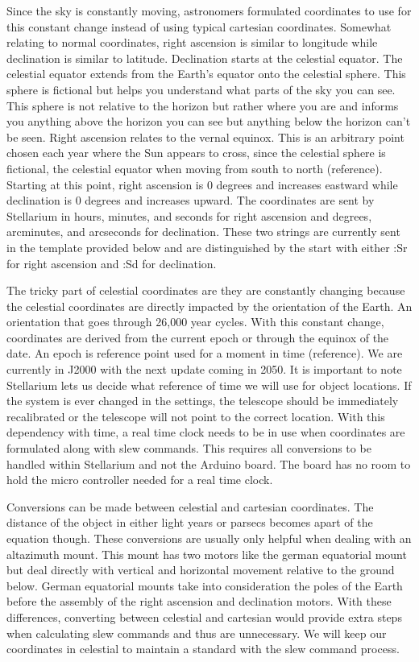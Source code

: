 \documentclass[12pt]{report}
\begin{document}
Since the sky is constantly moving, astronomers formulated coordinates to use for this constant change instead of using typical cartesian coordinates. Somewhat relating to normal coordinates, right ascension is similar to longitude while declination is similar to latitude. Declination starts at the celestial equator. The celestial equator extends from the Earth’s equator onto the celestial sphere. This sphere is fictional but helps you understand what parts of the sky you can see. This sphere is not relative to the horizon but rather where you are and informs you anything above the horizon you can see but anything below the horizon can’t be seen. Right ascension relates to the vernal equinox. This is an arbitrary point chosen each year where the Sun appears to cross, since the celestial sphere is fictional, the celestial equator when moving from south to north (reference). Starting at this point, right ascension is 0 degrees and increases eastward while declination is 0 degrees and increases upward. The coordinates are sent by Stellarium in hours, minutes, and seconds for right ascension and degrees, arcminutes, and arcseconds for declination. These two strings are currently sent in the template provided below and are distinguished by the start with either :Sr for right ascension and :Sd for declination.

The tricky part of celestial coordinates are they are constantly changing because the celestial coordinates are directly impacted by the orientation of the Earth. An orientation that goes through 26,000 year cycles. With this constant change, coordinates are derived from the current epoch or through the equinox of the date. An epoch is reference point used for a moment in time (reference). We are currently in J2000 with the next update coming in 2050. It is important to note Stellarium lets us decide what reference of time we will use for object locations. If the system is ever changed in the settings, the telescope should be immediately recalibrated or the telescope will not point to the correct location. With this dependency with time, a real time clock needs to be in use when coordinates are formulated along with slew commands. This requires all conversions to be handled within Stellarium and not the Arduino board. The board has no room to hold the micro controller needed for a real time clock.

Conversions can be made between celestial and cartesian coordinates. The distance of the object in either light years or parsecs becomes apart of the equation though. These conversions are usually only helpful when dealing with an altazimuth mount. This mount has two motors like the german equatorial mount but deal directly with vertical and horizontal movement relative to the ground below. German equatorial mounts take into consideration the poles of the Earth before the assembly of the right ascension and declination motors. With these differences, converting between celestial and cartesian would provide extra steps when calculating slew commands and thus are unnecessary. We will keep our coordinates in celestial to maintain a standard with the slew command process.
\end{document}
